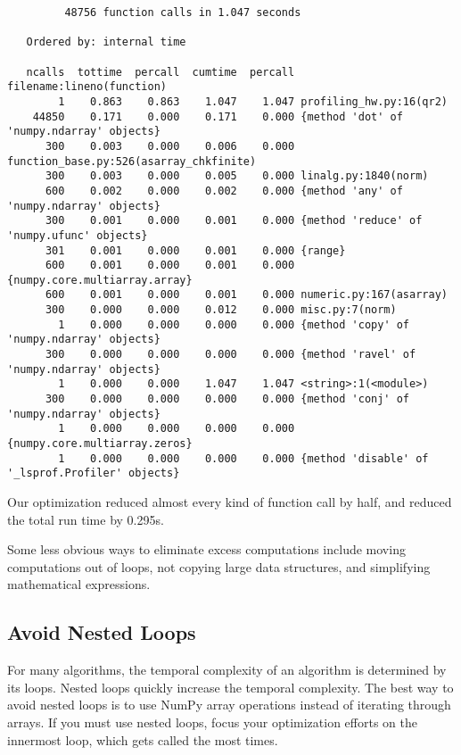 {\scriptsize
\begin{verbatim}
         48756 function calls in 1.047 seconds

   Ordered by: internal time

   ncalls  tottime  percall  cumtime  percall filename:lineno(function)
        1    0.863    0.863    1.047    1.047 profiling_hw.py:16(qr2)
    44850    0.171    0.000    0.171    0.000 {method 'dot' of 'numpy.ndarray' objects}
      300    0.003    0.000    0.006    0.000 function_base.py:526(asarray_chkfinite)
      300    0.003    0.000    0.005    0.000 linalg.py:1840(norm)
      600    0.002    0.000    0.002    0.000 {method 'any' of 'numpy.ndarray' objects}
      300    0.001    0.000    0.001    0.000 {method 'reduce' of 'numpy.ufunc' objects}
      301    0.001    0.000    0.001    0.000 {range}
      600    0.001    0.000    0.001    0.000 {numpy.core.multiarray.array}
      600    0.001    0.000    0.001    0.000 numeric.py:167(asarray)
      300    0.000    0.000    0.012    0.000 misc.py:7(norm)
        1    0.000    0.000    0.000    0.000 {method 'copy' of 'numpy.ndarray' objects}
      300    0.000    0.000    0.000    0.000 {method 'ravel' of 'numpy.ndarray' objects}
        1    0.000    0.000    1.047    1.047 <string>:1(<module>)
      300    0.000    0.000    0.000    0.000 {method 'conj' of 'numpy.ndarray' objects}
        1    0.000    0.000    0.000    0.000 {numpy.core.multiarray.zeros}
        1    0.000    0.000    0.000    0.000 {method 'disable' of '_lsprof.Profiler' objects}
\end{verbatim}
}

Our optimization reduced almost every kind of function call by half, and reduced the total run time by 0.295s.

Some less obvious ways to eliminate excess computations include moving computations out of loops, not copying large data structures, and simplifying mathematical expressions.


\subsection*{Avoid Nested Loops}
For many algorithms, the temporal complexity of an algorithm is determined by its loops. Nested loops quickly increase the temporal complexity.
The best way to avoid nested loops is to use NumPy array operations instead of iterating through arrays.
If you must use nested loops, focus your optimization efforts on the innermost loop, which gets called the most times.

